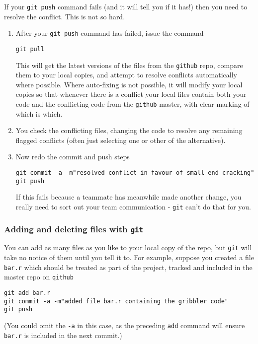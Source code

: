 \documentclass[10pt] {article}
\theoremstyle{definition}
\begin{document}
If your {\tt git push} command fails (and it will tell you if it has!) then you need to resolve the conflict. This is not so hard. 

\begin{enumerate}
\item After your {\tt git push} command has failed, issue the command
\begin{lstlisting}
git pull
\end{lstlisting}
This will get the latest versions of the files from the {\tt github} repo, compare them to your local copies, and attempt to resolve conflicts automatically where possible. Where auto-fixing is not possible, it will modify your local copies so that whenever there is a conflict your local files contain both your code and the conflicting code from the {\tt github} master, with clear marking of which is which. 
\item You check the conflicting files, changing the code to resolve any remaining flagged conflicts (often just selecting one or other of the alternative). 
\item Now redo the commit and push steps
\begin{lstlisting}
git commit -a -m"resolved conflict in favour of small end cracking"
git push
\end{lstlisting} 
If this fails because a teammate has meanwhile made another change, you really need to sort out your team communication - {\tt git} can't do that for you. 
\end{enumerate}

\subsubsection{Adding and deleting files with {\tt git}}

You can add as many files as you like to your local copy of the repo, but {\tt git} will take no notice of them until you tell it to. For example, suppose you created a file {\tt bar.r} which should be treated as part of the project, tracked and included in the master repo on {\tt qithub}
\begin{lstlisting}
git add bar.r
git commit -a -m"added file bar.r containing the gribbler code"
git push
\end{lstlisting}
(You could omit the \lstinline+-a+ in this case, as the preceding \lstinline+add+ command will ensure \lstinline+bar.r+ is included in the next commit.)
\end{document}
